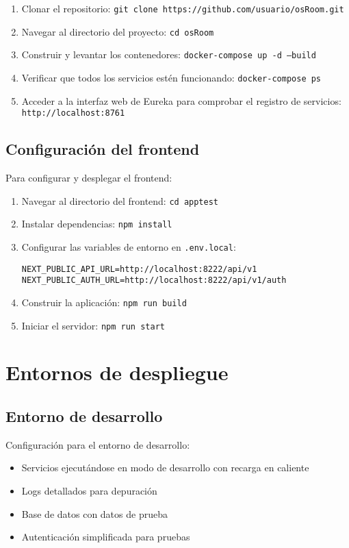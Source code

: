 \documentclass[12pt,a4paper]{report}
\begin{document}
\begin{enumerate}
    \item Clonar el repositorio: \texttt{git clone https://github.com/usuario/osRoom.git}
    \item Navegar al directorio del proyecto: \texttt{cd osRoom}
    \item Construir y levantar los contenedores: \texttt{docker-compose up -d --build}
    \item Verificar que todos los servicios estén funcionando: \texttt{docker-compose ps}
    \item Acceder a la interfaz web de Eureka para comprobar el registro de servicios: \texttt{http://localhost:8761}
\end{enumerate}

\subsection{Configuración del frontend}
Para configurar y desplegar el frontend:

\begin{enumerate}
    \item Navegar al directorio del frontend: \texttt{cd apptest}
    \item Instalar dependencias: \texttt{npm install}
    \item Configurar las variables de entorno en \texttt{.env.local}:
    \begin{lstlisting}
NEXT_PUBLIC_API_URL=http://localhost:8222/api/v1
NEXT_PUBLIC_AUTH_URL=http://localhost:8222/api/v1/auth
    \end{lstlisting}
    \item Construir la aplicación: \texttt{npm run build}
    \item Iniciar el servidor: \texttt{npm run start}
\end{enumerate}

\section{Entornos de despliegue}
\subsection{Entorno de desarrollo}
Configuración para el entorno de desarrollo:

\begin{itemize}
    \item Servicios ejecutándose en modo de desarrollo con recarga en caliente
    \item Logs detallados para depuración
    \item Base de datos con datos de prueba
    \item Autenticación simplificada para pruebas
\end{itemize}
\end{document}
